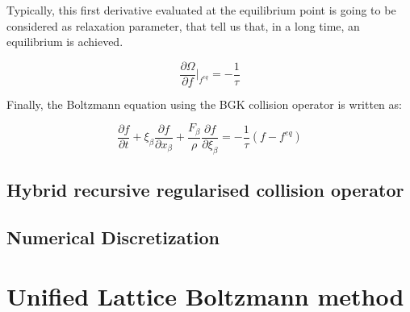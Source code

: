 Typically, this first derivative evaluated at the equilibrium point is going to 
be considered as relaxation parameter, that tell us that, in a long time, an
equilibrium is achieved.

\begin{equation}
	\frac{\partial \Omega}{\partial f} \bigg|_{f^{eq}} = -\frac{1}{\tau}	
\end{equation}

Finally, the Boltzmann equation using the BGK collision operator is written as:

\begin{equation}
		\frac{\partial f}{\partial t} 
		+ \xi_{\beta}\frac{\partial f}{\partial x_{\beta}}
		+ \frac{F_{\beta}}{\rho}\frac{\partial f}{\partial \xi_{\beta}} = -\frac{1}{\tau}(f-f^{eq})
\end{equation}






\subsection{Hybrid recursive regularised collision operator}

\subsection{Numerical Discretization}

\section{Unified Lattice Boltzmann method}